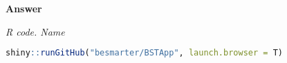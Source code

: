 \begin{enumerate}[leftmargin=*]
	\textbf{Answer}
	
	\begin{tcolorbox}[enhanced,width=4.67in,center upper,
		fontupper=\large\bfseries,drop shadow southwest,sharp corners]
		\textit{R code. Name}
		\begin{VF}
			\begin{lstlisting}[language=R]
	shiny::runGitHub("besmarter/BSTApp", launch.browser = T)
\end{lstlisting}
		\end{VF}
	\end{tcolorbox} 
	
\end{enumerate}